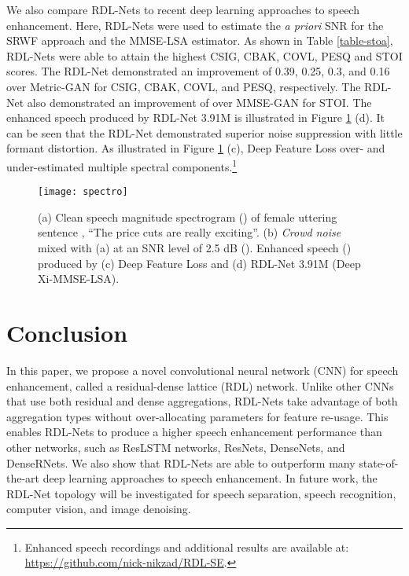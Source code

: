 \documentclass[letterpaper]{article} \usepackage{aaai20}  \usepackage{times}  \usepackage{helvet} \usepackage{courier}  \usepackage[hyphens]{url}  \usepackage{graphicx} \urlstyle{rm} \def\UrlFont{\rm}  \usepackage{graphicx}  \frenchspacing  \setlength{\pdfpagewidth}{8.5in}  \setlength{\pdfpageheight}{11in}
\begin{document}
We also compare RDL-Nets to recent deep learning approaches to speech enhancement. Here, RDL-Nets were used to estimate the \textit{a priori} SNR for the SRWF approach and the MMSE-LSA estimator. As shown in Table \ref{table-stoa}, RDL-Nets were able to attain the highest CSIG, CBAK, COVL, PESQ and STOI scores. The RDL-Net demonstrated an improvement of 0.39, 0.25, 0.3, and 0.16 over Metric-GAN for CSIG, CBAK, COVL, and PESQ, respectively. The RDL-Net also demonstrated an improvement of  over MMSE-GAN for STOI. The enhanced speech produced by RDL-Net 3.91M is illustrated in Figure \ref{fig-spectogram} (d). It can be seen that the RDL-Net demonstrated superior noise suppression with little formant distortion. As illustrated in Figure \ref{fig-spectogram} (c), Deep Feature Loss over- and under-estimated multiple spectral components.\footnote{Enhanced speech recordings and additional results are available at: \url{https://github.com/nick-nikzad/RDL-SE}.}
\begin{figure} [h!]
	\begin{center}
\texttt{[image: spectro]}
		\caption{(a) Clean speech magnitude spectrogram () of female  uttering sentence , ``The price cuts are really exciting''. (b) \textit{Crowd noise} mixed with (a) at an SNR level of 2.5 dB (). Enhanced speech () produced by (c) Deep Feature Loss and (d) RDL-Net 3.91M (Deep Xi-MMSE-LSA).}
		\label{fig-spectogram} 
	\end{center}
\end{figure}

\section{Conclusion} \label{secd}
In this paper, we propose a novel convolutional neural network (CNN) for speech enhancement, called a residual-dense lattice (RDL) network. Unlike other CNNs that use both residual and dense aggregations, RDL-Nets take advantage of both aggregation types without over-allocating parameters for feature re-usage. This enables RDL-Nets to produce a higher speech enhancement performance than other networks, such as ResLSTM networks, ResNets, DenseNets, and DenseRNets. We also show that RDL-Nets are able to outperform many state-of-the-art deep learning approaches to speech enhancement. In future work, the RDL-Net topology will be investigated for speech separation, speech recognition, computer vision, and image denoising.




\end{document}
